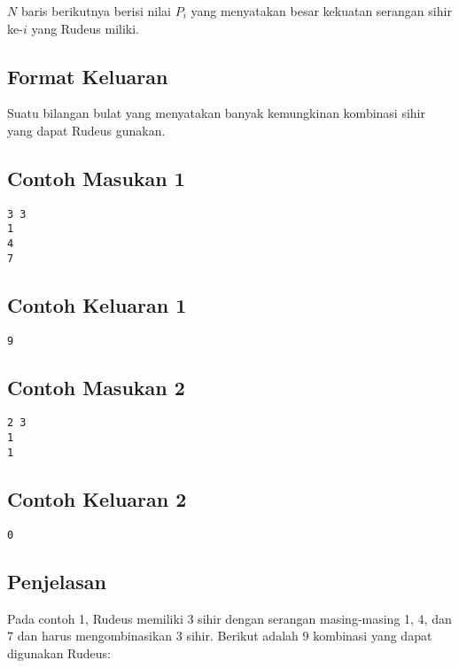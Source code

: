 \documentclass{article}
\begin{document}
$N$ baris berikutnya berisi nilai $P_i$ yang menyatakan besar kekuatan serangan sihir ke-$i$ yang Rudeus miliki.


\subsection*{Format Keluaran}

Suatu bilangan bulat yang menyatakan banyak kemungkinan kombinasi sihir yang dapat Rudeus gunakan.

\begin{multicols}{2}
\subsection*{Contoh Masukan 1}
\begin{lstlisting}
3 3
1
4
7
\end{lstlisting}
\columnbreak
\subsection*{Contoh Keluaran 1}
\begin{lstlisting}
9
\end{lstlisting}
\vfill
\null
\end{multicols}

\begin{multicols}{2}
\subsection*{Contoh Masukan 2}
\begin{lstlisting}
2 3
1
1
\end{lstlisting}
\columnbreak
\subsection*{Contoh Keluaran 2}
\begin{lstlisting}
0
\end{lstlisting}
\vfill
\null
\end{multicols}


\subsection*{Penjelasan}

Pada contoh 1, Rudeus memiliki 3 sihir dengan serangan masing-masing 1, 4, dan 7 dan harus mengombinasikan 3 sihir. Berikut adalah 9 kombinasi yang dapat digunakan Rudeus:
\end{document}
